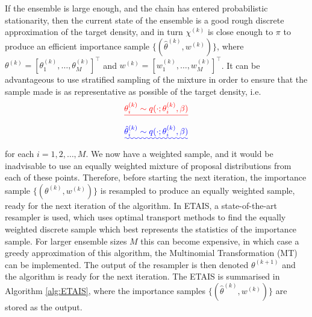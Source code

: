 \documentclass[final]{siamltex}
\providecommand{\DIFadd}[1]{{\protect\color{blue}\uwave{#1}}} %
\providecommand{\DIFdel}[1]{{\protect\color{red}\sout{#1}}}                      %
\providecommand{\DIFaddbegin}{} %
\providecommand{\DIFaddend}{} %
\providecommand{\DIFdelbegin}{} %
\providecommand{\DIFdelend}{} %
\newcommand{\DIFscaledelfig}{0.5}
\newlength{\DIFdelgraphicswidth} %
\newlength{\DIFdelgraphicsheight} %
\newcommand{\DIFaddincludegraphics}[2][]{{\color{blue}\fbox{\DIFOincludegraphics[#1]{#2}}}} %
\newcommand{\DIFdelincludegraphics}[2][]{%
\sbox{\DIFdelgraphicsbox}{\DIFOincludegraphics[#1]{#2}}%
\settoboxwidth{\DIFdelgraphicswidth}{\DIFdelgraphicsbox} %
\settoboxtotalheight{\DIFdelgraphicsheight}{\DIFdelgraphicsbox} %
\scalebox{\DIFscaledelfig}{%
\parbox[b]{\DIFdelgraphicswidth}{\usebox{\DIFdelgraphicsbox}\\[-\baselineskip] \rule{\DIFdelgraphicswidth}{0em}}\llap{\resizebox{\DIFdelgraphicswidth}{\DIFdelgraphicsheight}{%
\setlength{\unitlength}{\DIFdelgraphicswidth}%
\begin{picture}(1,1)%
\thicklines\linethickness{2pt} %
{\color[rgb]{1,0,0}\put(0,0){\framebox(1,1){}}}%
{\color[rgb]{1,0,0}\put(0,0){\line( 1,1){1}}}%
{\color[rgb]{1,0,0}\put(0,1){\line(1,-1){1}}}%
\end{picture}%
}\hspace*{3pt}}} %
} %
\DeclareRobustCommand{\DIFaddbegin}{\DIFOaddbegin \let\includegraphics\DIFaddincludegraphics} %
\DeclareRobustCommand{\DIFaddend}{\DIFOaddend \let\includegraphics\DIFOincludegraphics} %
\DeclareRobustCommand{\DIFdelbegin}{\DIFOdelbegin \let\includegraphics\DIFdelincludegraphics} %
\DeclareRobustCommand{\DIFdelend}{\DIFOaddend \let\includegraphics\DIFOincludegraphics} %
\begin{document}
If the ensemble is large enough, and the chain has entered
probabilistic stationarity, then the current state of the ensemble is
a good rough discrete approximation of the target density, and in turn
$\chi^{(k)}$ is close enough to $\pi$ to produce an efficient importance
sample $\{(\hat{\theta}^{(k)},w^{(k)})\}$,  where $\theta^{(k)} =
[\theta_1^{(k)}, \ldots, \theta_M^{(k)}]^\top$ and $w^{(k)} =
[w_1^{(k)}, \ldots, w_M^{(k)}]^\top$. It can be advantageous to use stratified sampling of the
mixture in order to
ensure that the sample made is as representative as possible of the
target density, i.e.
\DIFdelbegin \[ \DIFdel{\theta_i^{(k)} \sim q(\cdot ; \theta_i^{(k)},\beta)}\]
\DIFdelend \DIFaddbegin \begin{equation} \DIFadd{\hat{\theta}_i^{(k)} \sim q(\cdot ; \theta_i^{(k)},\beta)}\end{equation}
\DIFaddend for each $i = 1,2,\ldots,M$.  We now have a weighted sample, and it
would be inadvisable to use an equally weighted mixture of proposal
distributions from each of these points. Therefore, before starting
the next iteration, the importance sample
$\{(\theta^{(k)},w^{(k)})\}$ is resampled to produce an equally
weighted sample, ready for the next iteration of the algorithm. In
ETAIS, a state-of-the-art resampler is used, which uses optimal
transport methods to find the equally weighted discrete sample which
best represents the statistics of the importance
sample\cite{reich2013nonparametric}. For larger ensemble sizes $M$ this can become
expensive, in which case a greedy approximation of this algorithm, the
Multinomial Transformation (MT) can be
implemented\cite{cotter2015parallel}. The output of the resampler is then denoted
$\theta^{(k+1)}$ and the algorithm is ready for the next
iteration. The ETAIS is summarised in Algorithm \ref{alg:ETAIS}, where
the importance samples $\{(\hat{\theta}^{(k)},w^{(k)})\}$ are stored as
the output.
\end{document}
